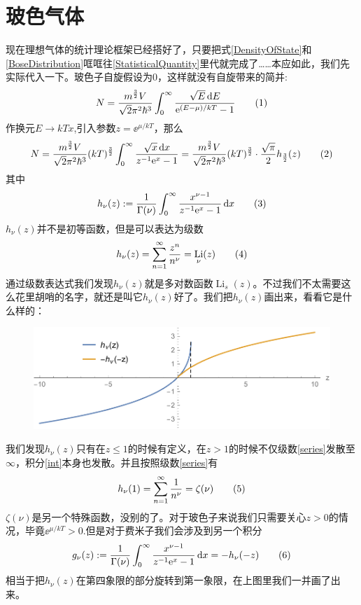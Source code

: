\documentclass[draft]{article}
\DeclareMathOperator{\li}{Li}
\begin{document}
	\section{玻色气体}
	现在理想气体的统计理论框架已经搭好了，只要把式\eqref{DensityOfState}和\eqref{BoseDistribution}哐哐往\eqref{StatisticalQuantity}里代就完成了……本应如此，我们先实际代入一下。玻色子自旋假设为0，这样就没有自旋带来的简并:
	\[\label{5}N=\frac{m^{\frac 32}V}{\sqrt{2}\pi^2\hbar^3}\int_0^\infty\frac{\sqrt{E}\diff E}{\ee^{(E-\mu)/kT}-1}\taghere\]
	作换元$ E\to kTx $,引入参数$ z=\ee^{\mu/kT} $，那么
	\[\label{6}N=\frac{m^{\frac 32}V}{\sqrt{2}\pi^2\hbar^3}(kT)^{\frac 32}\int_0^\infty\frac{\sqrt{x}\diff x}{z^{-1}\ee^x-1}=\frac{m^{\frac 32}V}{\sqrt{2}\pi^2\hbar^3}(kT)^{\frac 32}\cdot\frac{\sqrt\pi}{2}h_{\frac 32}(z)\taghere\]
	其中
	\[\label{int}h_\nu(z):=\frac 1{\Gamma(\nu)}\int_0^{\infty}\frac{x^{\nu-1}}{z^{-1}\ee^x-1}\diff x\taghere\]
	$ h_\nu(z) $并不是初等函数，但是可以表达为级数
	\[\label{series}h_\nu(z)=\sum_{n=1}^\infty\frac{z^n}{n^\nu}=\li_\nu(z)\taghere\]
	通过级数表达式我们发现$ h_\nu(z) $就是多对数函数$ \li_s(z) $。不过我们不太需要这么花里胡哨的名字，就还是叫它$ h_\nu(z) $好了。我们把$ h_\nu(z) $画出来，看看它是什么样的：
	\begin{figure}[h]
		\includegraphics[width=\linewidth]{fig1}\label{fig1}
	\end{figure}

	我们发现$ h_\nu(z) $只有在$ z\le 1 $的时候有定义，在$ z>1 $的时候不仅级数\eqref{series}发散至$ \infty $，积分\eqref{int}本身也发散。并且按照级数\eqref{series}有
	\[h_\nu(1)=\sum_{n=1}^{\infty}\frac{1}{n^\nu}=\zeta(\nu)\taghere\]
	$ \zeta(\nu) $是另一个特殊函数，没别的了。对于玻色子来说我们只需要关心$ z>0 $的情况，毕竟$ \ee^{\mu/kT}>0 $.但是对于费米子我们会涉及到另一个积分
	\[g_\nu(z):=\frac{1}{\Gamma(\nu)}\int_0^\infty\frac{x^{\nu-1}}{z^{-1}\ee^x-1}\diff x=-h_\nu(-z)\taghere\]
	相当于把$ h_\nu(z) $在第四象限的部分旋转到第一象限，在上图里我们一并画了出来。
	
\end{document}

